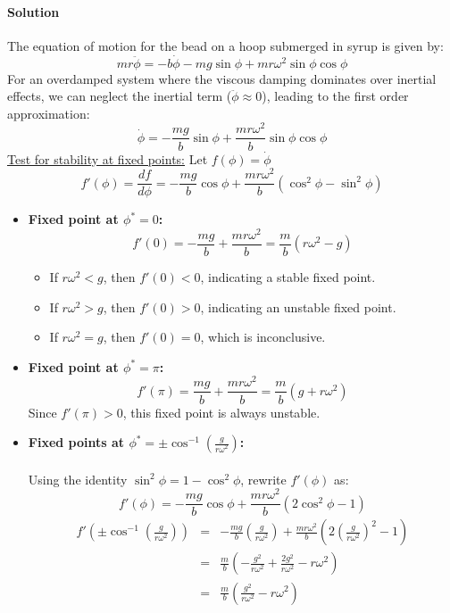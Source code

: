 \documentclass[11pt]{article}
\begin{document}
\paragraph{Solution}\mbox{}
The equation of motion for the bead on a hoop submerged in syrup is given by:
\[mr\ddot{\phi} = -b \dot{\phi} -mg\sin\phi +mr\omega^2 \sin\phi \cos\phi\]
For an overdamped system where the viscous damping dominates over inertial effects, we can neglect the inertial term (\(\ddot{\phi}\approx 0\)), leading to the first order approximation:
\[\dot{\phi} = -\frac{mg}{b}\sin\phi + \frac{mr\omega^2}{b}\sin\phi \cos\phi\]
\underline{Test for stability at fixed points:} Let $f(\phi) = \dot{\phi}$
\[f'(\phi) =\frac{df}{d\phi}= -\frac{mg}{b}\cos\phi + \frac{mr\omega^2}{b}(\cos^2\phi - \sin^2\phi)\]
\begin{itemize}
    \item \textbf{Fixed point at $\phi^* = 0$:}
    \[f'(0) = -\frac{mg}{b} + \frac{mr\omega^2}{b} = \frac{m}{b}(r\omega^2 - g)\]
    \begin{itemize}
        \item If $r\omega^2 < g$, then $f'(0) < 0$, indicating a stable fixed point.
        \item If $r\omega^2 > g$, then $f'(0) > 0$, indicating an unstable fixed point.
        \item If $r\omega^2 = g$, then $f'(0) = 0$, which is inconclusive.
    \end{itemize}
    \item \textbf{Fixed point at $\phi^* = \pi$:}
    \[f'(\pi) = \frac{mg}{b} + \frac{mr\omega^2}{b} = \frac{m}{b}(g + r\omega^2)\]
    Since $f'(\pi) > 0$, this fixed point is always unstable.
    \item \textbf{Fixed points at $\phi^* = \pm\cos^{-1}\left(\frac{g}{r\omega^2}\right)$:}\\\\
    Using the identity $\sin^2\phi = 1 - \cos^2\phi$, rewrite $f'(\phi)$ as:
    \[f'(\phi) = -\frac{mg}{b}\cos\phi + \frac{mr\omega^2}{b}(2\cos^2\phi - 1)\]
  \begin{eqnarray*}
    f'\left(\pm\cos^{-1}\left(\frac{g}{r\omega^2}\right)\right)
    &=& -\frac{mg}{b}\left(\frac{g}{r\omega^2}\right)
    + \frac{mr\omega^2}{b}\left(2\left(\frac{g}{r\omega^2}\right)^2 - 1\right)\\
    &=& \frac{m}{b}\left(-\frac{g^2}{r\omega^2} + \frac{2g^2}{r\omega^2} - r\omega^2\right)\\
    &=& \frac{m}{b}\left(\frac{g^2}{r\omega^2} - r\omega^2\right)\\

\end{eqnarray*}
\end{itemize}
\end{document}
